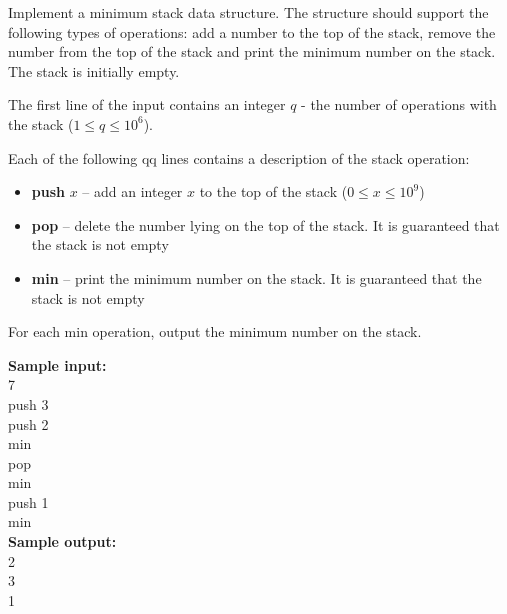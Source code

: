 \documentclass[a4paper]{article}
\begin{document}
Implement a minimum stack data structure. The structure should support the following types of operations: add a number to the top of the stack, remove the number from the top of the stack and print the minimum number on the stack. The stack is initially empty.

The first line of the input contains an integer $q$ - the number of operations with the stack ($1 \le q \le 10^6$).

Each of the following qq lines contains a description of the stack operation:
\begin{itemize}
\item \textbf{push} $x$ -- add an integer $x$ to the top of the stack ($0 \le x \le 10^9$)
\item \textbf{pop} -- delete the number lying on the top of the stack. It is guaranteed that the stack is not empty
\item \textbf{min} -- print the minimum number on the stack. It is guaranteed that the stack is not empty
\end{itemize}
For each min operation, output the minimum number on the stack.

\LINE

\noindent \textbf{Sample input:}\\
7\\
push 3\\
push 2\\
min\\
pop\\
min\\
push 1\\
min\\


\noindent \textbf{Sample output:}\\
2\\
3\\
1\\
\end{document}
